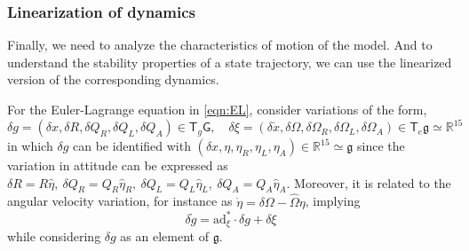 \documentclass[10pt]{article}
\newcommand{\T}{\ensuremath{\mathsf{T}}}
\newcommand{\ad}{\ensuremath{\mathrm{ad}}}
\newcommand{\G}{\ensuremath{\mathsf{G}}}
\newcommand{\g}{\ensuremath{\mathfrak{g}}}
\begin{document}
\subsubsection{Linearization of dynamics}
Finally, we need to analyze the characteristics of motion of the model. And to understand the stability properties of a state trajectory, we can use the linearized version of the corresponding dynamics.

For the Euler-Lagrange equation in \eqref{eqn:EL}, consider variations of the form,
\[ \delta g = (\delta x, \delta R, \delta Q_R, \delta Q_L, \delta Q_A) \in \T_{g}\G, \quad \delta \xi = (\delta \dot{x}, \delta\Omega, \delta\Omega_R, \delta\Omega_L, \delta\Omega_A) \in \T_e \g \simeq \mathbb{R}^{15} \]
in which $ \delta g $ can be identified with $ (\delta x, \eta, \eta_R, \eta_L, \eta_A) \in \mathbb{R}^{15} \simeq \g $ since the variation in attitude can be expressed as $ \delta R = R \hat{\eta},\ \delta Q_R = Q_R \hat{\eta}_R,\ \delta Q_L = Q_L \hat{\eta}_L,\ \delta Q_A = Q_A \hat{\eta}_A $. Moreover, it is related to the angular velocity variation, for instance as $ \dot{\eta} = \delta\Omega - \hat{\Omega} \eta $, implying
\begin{equation*}
	\delta \dot{g} = \ad^*_{\xi} \cdot \delta g + \delta \xi
\end{equation*}
while considering $ \delta g $ as an element of $ \g $.
\end{document}
